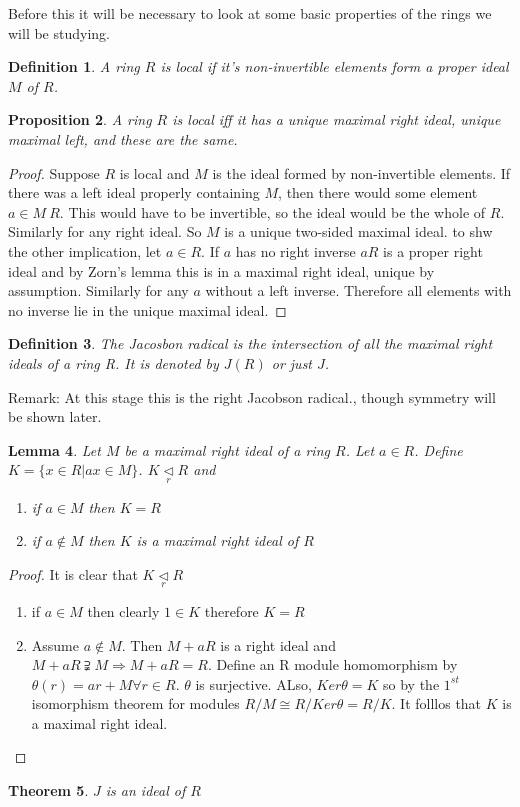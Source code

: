 \documentclass[a4paper,10pt]{article}
\newtheorem{thm}{Theorem}[subsection]
\newtheorem{prop}[thm]{Proposition}
\newtheorem{defn}[thm]{Definition}
\newtheorem{lem}[thm]{Lemma}
\begin{document}
Before this it will be necessary to look at some basic properties of the rings we will be studying.

\begin{defn}
	A ring $R$ is local if it's non-invertible elements form a proper ideal $M$ of $R$.
\end{defn}

\begin{prop}
	A ring $R$ is local iff it has a unique maximal right ideal, unique maximal left, and these are the same.
\end{prop}
\begin{proof}
	Suppose $R$ is local and $M$ is the ideal formed by non-invertible elements. If there was a left ideal properly containing $M$, then there would some element $a\in M\ R$. This would have to be invertible, so the ideal would be the whole of $R$. Similarly for any right ideal. So $M$ is a unique two-sided maximal ideal.
	\newline to shw the other implication, let $a\in R$. If $a$ has no right inverse $aR$ is a proper right ideal and by Zorn's lemma this is in a maximal right ideal, unique by assumption. Similarly for any $a$ without a left inverse. Therefore all elements with no inverse lie in the unique maximal ideal.
\end{proof}

\begin{defn}
The Jacosbon radical is the intersection of all the maximal right ideals of a ring R. It is denoted by $J(R)$ or just $J$.
\end{defn}

Remark: At this stage this is the right Jacobson radical., though symmetry will be shown later.

\begin{lem}
Let $M$ be a maximal right ideal of a ring $R$. Let $a \in R$. Define $K=\{ x\in R|ax\in M\}$. $K \underset{r}{\vartriangleleft} R$ and
	\begin{enumerate}
		\item if $a\in M$ then $K=R$ \item if $a\notin M$ then $K$ is a maximal right ideal of $R$
	\end{enumerate}
\end{lem}
\begin{proof}
It is clear that $K \underset{r}{\vartriangleleft} R$
	\begin{enumerate}
		\item if $a\in M$ then clearly $1\in K$ therefore $K=R$ \item Assume $a\notin M$. Then $M+aR$ is a right ideal and $M+aR\supsetneqq  M \Rightarrow M+aR=R$. Define an R module homomorphism by $\theta(r)=ar+M \forall r\in R$. $\theta$ is surjective. ALso, $Ker\theta =K$ so by the $1^{st}$ isomorphism theorem for modules $R/M\cong R/Ker\theta =R/K$. It folllos that $K$ is a maximal right ideal.
	\end{enumerate}
\end{proof}
\begin{thm}
 $J$ is an ideal of $R$
\end{thm}
\end{document}
